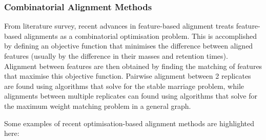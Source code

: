 \subsubsection{Combinatorial Alignment Methods}

From literature survey, recent advances in feature-based alignment treats feature-based alignments as a combinatorial optimisation problem. This is accomplished by defining an objective function that minimises the difference between aligned features (usually by the difference in their masses and retention times). Alignment between features are then obtained by finding the matching of features that maximise this objective function. Pairwise alignment between 2 replicates are found using algorithms that solve for the stable marriage problem, while alignments between multiple replicates can found using algorithms that solve for the maximum weight matching problem in a general graph.

Some examples of recent optimisation-based alignment methods are highlighted
here:

